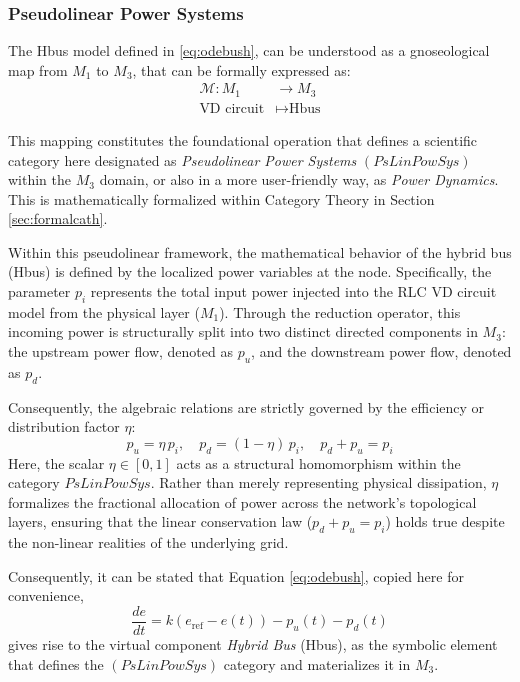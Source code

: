 \documentclass[11pt, a4paper]{article}
\begin{document}
\subsubsection{Pseudolinear Power Systems} \label{sec:pseudolinear}

The Hbus model defined in \ref{eq:odebush}, can be understood as a gnoseological map from $M_1$ to $M_3$, that can be formally expressed as:
\begin{equation}
\begin{aligned}
    \mathcal{M} : M_1 &\to M_3 \\
    \text{VD circuit} &\mapsto \text{Hbus}
\end{aligned}
\label{eq:gnoseo_map}
\end{equation}

This mapping constitutes the foundational operation that
defines a scientific category here designated as \textit{Pseudolinear Power Systems} $(\mathit{PsLinPowSys})$ within the $M_3$ domain, or also in a more user-friendly way, as \textit{Power Dynamics}.
This is mathematically formalized within Category Theory in Section \ref{sec:formalcath}.


Within this pseudolinear framework, the mathematical behavior of the hybrid bus (Hbus) is defined by the localized power variables at the node. Specifically, the parameter $p_i$ represents the total input power injected into the RLC VD circuit model from the physical layer ($M_1$). Through the reduction operator, this incoming power is structurally split into two distinct directed components in $M_3$: the upstream power flow, denoted as $p_u$, and the downstream power flow, denoted as $p_d$.

Consequently, the algebraic relations are strictly governed by the efficiency or distribution factor $\eta$:
\begin{equation}
	p_u = \eta\, p_i,\quad  p_d = (1-\eta)\, p_i, \quad  p_d + p_u = p_i
	\label{eq:bus_parameters}
\end{equation}
Here, the scalar $\eta \in [0, 1]$ acts as a structural homomorphism within the category $\mathit{PsLinPowSys}$. Rather than merely representing physical dissipation, $\eta$ formalizes the fractional allocation of power across the network's topological layers, ensuring that the linear conservation law ($p_d + p_u = p_i$) holds true despite the non-linear realities of the underlying grid.

Consequently, it can be stated that Equation \ref{eq:odebush}, copied here for convenience,
\[
\frac{de}{dt} = k (e_{\text{ref}} - e(t)) - p_u(t) - p_d(t)
\]
gives rise to the virtual component \textit{Hybrid Bus} (Hbus), as the symbolic element that defines the $(\mathit{PsLinPowSys})$ category and materializes it in $M_3$.
\end{document}
